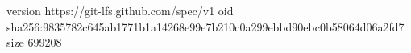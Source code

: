 version https://git-lfs.github.com/spec/v1
oid sha256:9835782c645ab1771b1a14268e99e7b210c0a299ebbd90ebc0b58064d06a2fd7
size 699208

